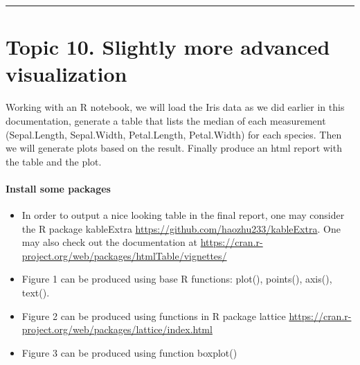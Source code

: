 \documentclass[
]{article}
\begin{document}
\begin{center}\rule{0.5\linewidth}{0.5pt}\end{center}

\hypertarget{topic-10.-slightly-more-advanced-visualization}{%
\section{Topic 10. Slightly more advanced
visualization}\label{topic-10.-slightly-more-advanced-visualization}}

Working with an R notebook, we will load the Iris data as we did earlier
in this documentation, generate a table that lists the median of each
measurement (Sepal.Length, Sepal.Width, Petal.Length, Petal.Width) for
each species. Then we will generate plots based on the result. Finally
produce an html report with the table and the plot.

\hypertarget{install-some-packages}{%
\paragraph{Install some packages}\label{install-some-packages}}

\begin{itemize}
\item
  In order to output a nice looking table in the final report, one may
  consider the R package kableExtra
  \url{https://github.com/haozhu233/kableExtra}. One may also check out
  the documentation at
  \url{https://cran.r-project.org/web/packages/htmlTable/vignettes/}
\item
  Figure 1 can be produced using base R functions: plot(), points(),
  axis(), text().
\item
  Figure 2 can be produced using functions in R package lattice
  \url{https://cran.r-project.org/web/packages/lattice/index.html}
\item
  Figure 3 can be produced using function boxplot()
\end{itemize}
\end{document}

